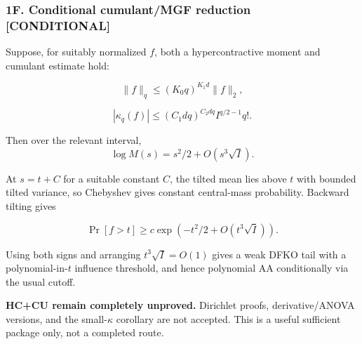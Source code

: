 \subsubsection{1F. Conditional cumulant/MGF reduction {[}CONDITIONAL{]}}\label{f.-conditional-cumulantmgf-reduction-conditional}

Suppose, for suitably normalized \(f\), both a hypercontractive moment and cumulant estimate hold:

\[\|f\|_q\le(K_0q)^{K_1d}\|f\|_2, \tag{HC}\]

\[|\kappa_q(f)|\le(C_1dq)^{C_2dq}I^{q/2-1}q!. \tag{CU}\]

Then over the relevant interval,
\[\log M(s)=s^2/2+O(s^3\sqrt I).\]

At \(s=t+C\) for a suitable constant \(C\), the tilted mean lies above \(t\) with bounded tilted variance, so Chebyshev gives constant central-mass probability. Backward tilting gives

\[\Pr[f>t]\ge c\exp(-t^2/2+O(t^3\sqrt I)).\]

Using both signs and arranging \(t^3\sqrt I=O(1)\) gives a weak DFKO tail with a polynomial-in-\(t\) influence threshold, and hence polynomial AA conditionally via the usual cutoff.

\textbf{HC+CU remain completely unproved.} Dirichlet proofs, derivative/ANOVA versions, and the small-\(\kappa\) corollary are not accepted. This is a useful sufficient package only, not a completed route.
